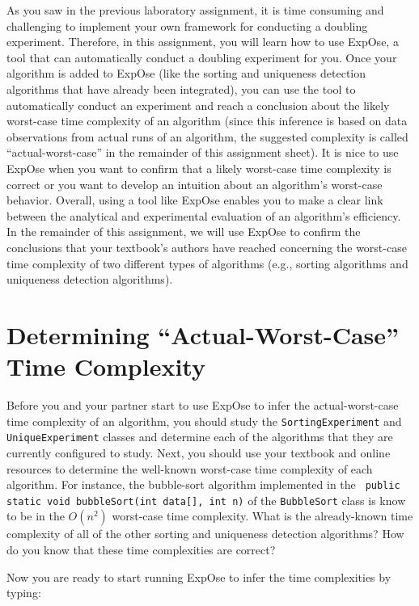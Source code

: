As you saw in the previous laboratory assignment, it is time consuming and challenging to implement your own framework
for conducting a doubling experiment. Therefore, in this assignment, you will learn how to use {\sc ExpOse}, a tool that
can automatically conduct a doubling experiment for you. Once your algorithm is added to {\sc ExpOse} (like the sorting
and uniqueness detection algorithms that have already been integrated), you can use the tool to automatically conduct an
experiment and reach a conclusion about the likely worst-case time complexity of an algorithm (since this inference is
based on data observations from actual runs of an algorithm, the suggested complexity is called ``actual-worst-case'' in
the remainder of this assignment sheet). It is nice to use {\sc ExpOse} when you want to confirm that a likely
worst-case time complexity is correct or you want to develop an intuition about an algorithm's worst-case behavior.
Overall, using a tool like {\sc ExpOse} enables you to make a clear link between the analytical and experimental
evaluation of an algorithm's efficiency. In the remainder of this assignment, we will use {\sc ExpOse} to confirm the
conclusions that your textbook's authors have reached concerning the worst-case time complexity of two different types of
algorithms (e.g., sorting algorithms and uniqueness detection algorithms).

\section*{Determining ``Actual-Worst-Case'' Time Complexity}

Before you and your partner start to use {\sc ExpOse} to infer the actual-worst-case time complexity of an algorithm,
you should study the {\tt SortingExperiment} and {\tt UniqueExperiment} classes and determine each of the algorithms
that they are currently configured to study. Next, you should use your textbook and online resources to determine the
well-known worst-case time complexity of each algorithm. For instance, the bubble-sort algorithm implemented in the {\tt
public static void bubbleSort(int data[], int n)} of the {\tt BubbleSort} class is know to be in the $O(n^2)$ worst-case
time complexity. What is the already-known time complexity of all of the other sorting and uniqueness detection
algorithms? How do you know that these time complexities are correct?

\noindent Now you are ready to start running {\sc ExpOse} to infer the time complexities by typing:

